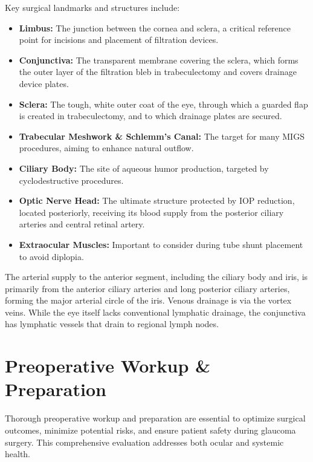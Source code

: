 Key surgical landmarks and structures include:
\begin{itemize}
  \item \textbf{Limbus:} The junction between the cornea and sclera, a critical reference point for incisions and placement of filtration devices.
  \item \textbf{Conjunctiva:} The transparent membrane covering the sclera, which forms the outer layer of the filtration bleb in trabeculectomy and covers drainage device plates.
  \item \textbf{Sclera:} The tough, white outer coat of the eye, through which a guarded flap is created in trabeculectomy, and to which drainage plates are secured.
  \item \textbf{Trabecular Meshwork \& Schlemm's Canal:} The target for many MIGS procedures, aiming to enhance natural outflow.
  \item \textbf{Ciliary Body:} The site of aqueous humor production, targeted by cyclodestructive procedures.
  \item \textbf{Optic Nerve Head:} The ultimate structure protected by IOP reduction, located posteriorly, receiving its blood supply from the posterior ciliary arteries and central retinal artery.
  \item \textbf{Extraocular Muscles:} Important to consider during tube shunt placement to avoid diplopia.
\end{itemize}
The arterial supply to the anterior segment, including the ciliary body and iris, is primarily from the anterior ciliary arteries and long posterior ciliary arteries, forming the major arterial circle of the iris. Venous drainage is via the vortex veins. While the eye itself lacks conventional lymphatic drainage, the conjunctiva has lymphatic vessels that drain to regional lymph nodes.

\section*{Preoperative Workup \& Preparation}
Thorough preoperative workup and preparation are essential to optimize surgical outcomes, minimize potential risks, and ensure patient safety during glaucoma surgery. This comprehensive evaluation addresses both ocular and systemic health.

